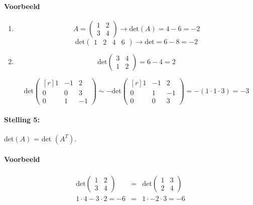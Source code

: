 \paragraph{Voorbeeld}
\begin{enumerate}
	\item \[ A = \begin{pmatrix} 1 & 2 \\ 3 & 4 \end{pmatrix} \to \mbox{det}(A) = 4-6 = -2 \]
	\[ \mbox{det}\begin{pmatrix} 1 & 2 & 4 & 6 \end{pmatrix} \to \mbox{det} = 6 - 8 = -2 \]
	
	\item \[ \mbox{det} \begin{pmatrix}3 & 4 \\ 1 & 2 \end{pmatrix} = 6 - 4 = 2 \]
	
	\[ \mbox{det} \begin{pmatrix*}[r]
		1 & -1 & 2 \\
		0 & 0 & 3 \\
		0 & 1 & -1
	\end{pmatrix*} \sim -\mbox{det} \begin{pmatrix*}[r]
		1 & -1 & 2 \\
		0 & 1 & -1 \\
		0 & 0 & 3
	\end{pmatrix*} = -(1 \cdot 1 \cdot 3) = -3 \]
\end{enumerate}

\paragraph{Stelling 5:} 
det$(A)$ = det $(A^T)$.
\paragraph{Voorbeeld}
\begin{eqnarray*}
	\mbox{det}\begin{pmatrix} 1 & 2 \\ 3 & 4 \end{pmatrix} &=& \mbox{det} \begin{pmatrix} 1 & 3 \\ 2 & 4 \end{pmatrix} \\
	1 \cdot 4 - 3 \cdot 2 = -6 &=& 1 \cdot - 2 \cdot 3 = -6
\end{eqnarray*}

